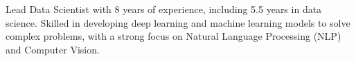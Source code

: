 

\begin{cvparagraph}

Lead Data Scientist with 8 years of experience, including 5.5 
years in data science. Skilled in developing deep learning and 
machine learning models to solve complex problems, with a strong 
focus on Natural Language Processing (NLP) and Computer Vision.
\end{cvparagraph}
